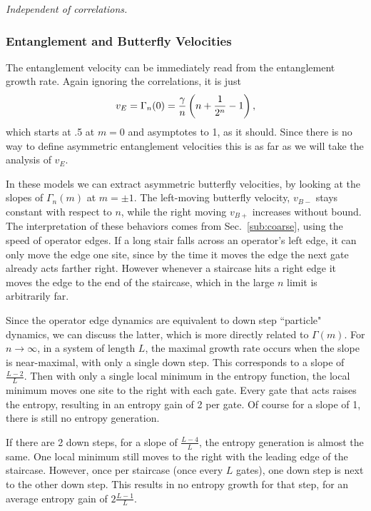 \emph{Independent of correlations.}

\subsubsection{Entanglement and Butterfly Velocities} \label{susub:vels}

The entanglement velocity can be immediately read from the entanglement growth rate. Again ignoring the correlations, it is just 
\begin{align}
v_E=\Gamma_n(0)=\frac{\gamma}{n}\left(n+\frac{1}{2^n}-1\right),
\end{align}
which starts at .5 at $m=0$ and asymptotes to 1, as it should. Since there is no way to define asymmetric entanglement velocities this is as far as we will take the analysis of $v_E$.

In these models we can extract asymmetric butterfly velocities, by looking at the slopes of $\Gamma_n(m)$ at $m=\pm 1$. The left-moving butterfly velocity, $v_{B-}$ stays constant with respect to $n$, while the right moving $v_{B+}$ increases without bound. The interpretation of these behaviors comes from Sec.~\ref{sub:coarse}, using the speed of operator edges. If a long stair falls across an operator's left edge, it can only move the edge one site, since by the time it moves the edge the next gate already acts farther right. However whenever a staircase hits a right edge it moves the edge to the end of the staircase, which in the large $n$ limit is arbitrarily far.

Since the operator edge dynamics are equivalent to down step ``particle" dynamics, we can discuss the latter, which is more directly related to $\Gamma(m)$.
For $n\to\infty$, in a system of length $L$, the maximal growth rate occurs when the slope is near-maximal, with only a single down step. This corresponds to a slope of $\frac{L-2}{L}$. Then with only a single local minimum in the entropy function, the local minimum moves one site to the right with each gate. Every gate that acts raises the entropy, resulting in an entropy gain of 2 per gate. Of course for a slope of 1, there is still no entropy generation.

If there are 2 down steps, for a slope of $\frac{L-4}{L}$, the entropy generation is almost the same. One local minimum still moves to the right with the leading edge of the staircase. However, once per staircase (once every $L$ gates), one down step is next to the other down step. This results in no entropy growth for that step, for an average entropy gain of $2\frac{L-1}{L}$.

